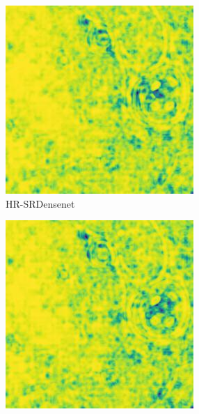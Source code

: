 \begin{figure}[H]
  \begin{subfigure}[H]{0.275\textwidth}
    \includegraphics[width=\textwidth]{Chapter7/SSIM_densenet_445.jpg}
    \caption{HR-SRDensenet}
  \end{subfigure}
  \begin{subfigure}[H]{0.275\textwidth}
    \includegraphics[width=\textwidth]{Chapter7/SSIM_rcan_445.jpg}

\end{subfigure}
\end{figure}
